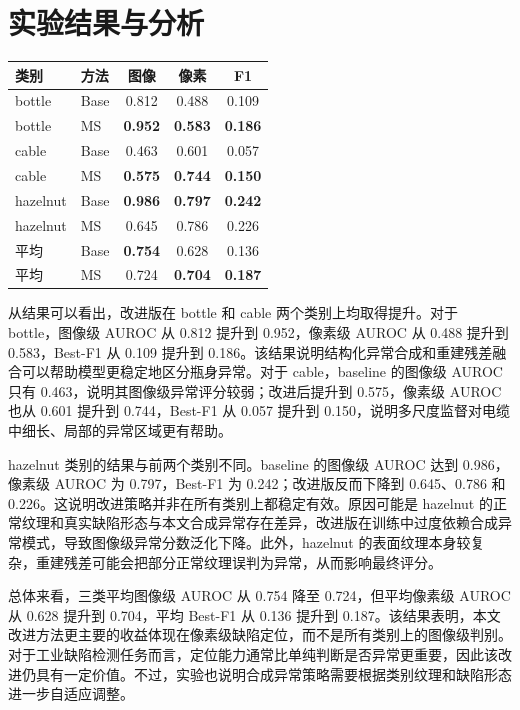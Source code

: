 \documentclass[UTF8,a4paper,twocolumn]{ctexart}
\begin{document}
\section{实验结果与分析}
\begin{table}[h]
\centering
\small
\setlength{\tabcolsep}{3pt}
\begin{tabular}{llccc}
\toprule
类别 & 方法 & 图像 & 像素 & F1 \\
\midrule
bottle & Base & 0.812 & 0.488 & 0.109 \\
bottle & MS & \textbf{0.952} & \textbf{0.583} & \textbf{0.186} \\
cable & Base & 0.463 & 0.601 & 0.057 \\
cable & MS & \textbf{0.575} & \textbf{0.744} & \textbf{0.150} \\
hazelnut & Base & \textbf{0.986} & \textbf{0.797} & \textbf{0.242} \\
hazelnut & MS & 0.645 & 0.786 & 0.226 \\
\midrule
平均 & Base & \textbf{0.754} & 0.628 & 0.136 \\
平均 & MS & 0.724 & \textbf{0.704} & \textbf{0.187} \\
\bottomrule
\end{tabular}
\end{table}

从结果可以看出，改进版在 bottle 和 cable 两个类别上均取得提升。对于 bottle，图像级 AUROC 从 0.812 提升到 0.952，像素级 AUROC 从 0.488 提升到 0.583，Best-F1 从 0.109 提升到 0.186。该结果说明结构化异常合成和重建残差融合可以帮助模型更稳定地区分瓶身异常。对于 cable，baseline 的图像级 AUROC 只有 0.463，说明其图像级异常评分较弱；改进后提升到 0.575，像素级 AUROC 也从 0.601 提升到 0.744，Best-F1 从 0.057 提升到 0.150，说明多尺度监督对电缆中细长、局部的异常区域更有帮助。

hazelnut 类别的结果与前两个类别不同。baseline 的图像级 AUROC 达到 0.986，像素级 AUROC 为 0.797，Best-F1 为 0.242；改进版反而下降到 0.645、0.786 和 0.226。这说明改进策略并非在所有类别上都稳定有效。原因可能是 hazelnut 的正常纹理和真实缺陷形态与本文合成异常存在差异，改进版在训练中过度依赖合成异常模式，导致图像级异常分数泛化下降。此外，hazelnut 的表面纹理本身较复杂，重建残差可能会把部分正常纹理误判为异常，从而影响最终评分。

总体来看，三类平均图像级 AUROC 从 0.754 降至 0.724，但平均像素级 AUROC 从 0.628 提升到 0.704，平均 Best-F1 从 0.136 提升到 0.187。该结果表明，本文改进方法更主要的收益体现在像素级缺陷定位，而不是所有类别上的图像级判别。对于工业缺陷检测任务而言，定位能力通常比单纯判断是否异常更重要，因此该改进仍具有一定价值。不过，实验也说明合成异常策略需要根据类别纹理和缺陷形态进一步自适应调整。
\end{document}
